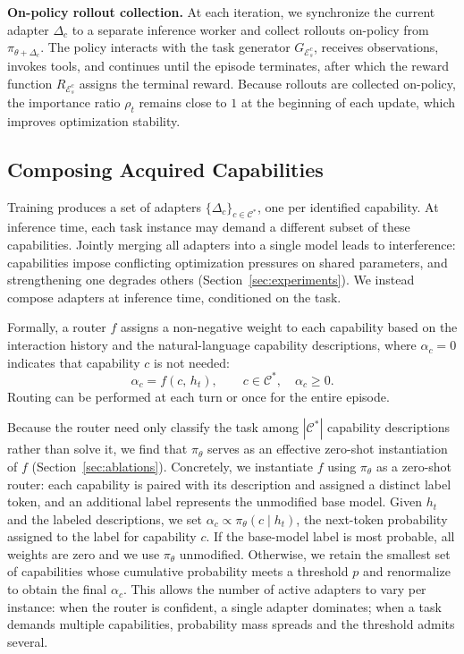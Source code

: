 \noindent\textbf{On-policy rollout collection.} At each iteration, we synchronize the current adapter $\Delta_c$ to a separate inference worker and collect rollouts on-policy from $\pi_{\theta+\Delta_c}$. The policy interacts with the task generator $G_{\mathcal{E}_s^c}$, receives observations, invokes tools, and continues until the episode terminates, after which the reward function $R_{\mathcal{E}_s^c}$ assigns the terminal reward. Because rollouts are collected on-policy, the importance ratio $\rho_t$ remains close to $1$ at the beginning of each update, which improves optimization stability.



\subsection{Composing Acquired Capabilities}
\label{sec:composition}

Training produces a set of adapters $\{\Delta_c\}_{c \in \mathcal{C}^*}$, one per identified capability. At inference time, each task instance may demand a different subset of these capabilities. Jointly merging all adapters into a single model leads to interference: capabilities impose conflicting optimization pressures on shared parameters, and strengthening one degrades others (Section~\ref{sec:experiments}). We instead compose adapters at inference time, conditioned on the task.

Formally, a router $f$ assigns a non-negative weight to each capability based on the interaction history and the natural-language capability descriptions, where $\alpha_c = 0$ indicates that capability $c$ is not needed:
\[
\alpha_c = f(c,\, h_t), \qquad c \in \mathcal{C}^*,\quad \alpha_c \geq 0.
\]
Routing can be performed at each turn or once for the entire episode. 


Because the router need only classify the task among $|\mathcal{C}^*|$ capability descriptions rather than solve it, we find that $\pi_\theta$ serves as an effective zero-shot instantiation of $f$ (Section~\ref{sec:ablations}). Concretely, we instantiate $f$ using $\pi_\theta$ as a zero-shot router: each capability is paired with its description and assigned a distinct label token, and an additional label represents the unmodified base model. Given $h_t$ and the labeled descriptions, we set $\alpha_c \propto \pi_\theta(c \mid h_t)$, the next-token probability assigned to the label for capability $c$. If the base-model label is most probable, all weights are zero and we use $\pi_\theta$ unmodified. Otherwise, we retain the smallest set of capabilities whose cumulative probability meets a threshold $p$ and renormalize to obtain the final $\alpha_c$. This allows the number of active adapters to vary per instance: when the router is confident, a single adapter dominates; when a task demands multiple capabilities, probability mass spreads and the threshold admits several.

